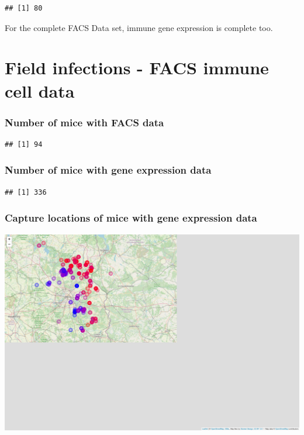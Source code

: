 \documentclass[
]{article}
\newenvironment{Shaded}{\begin{snugshade}}{\end{snugshade}}
\newcommand{\FunctionTok}[1]{\textcolor[rgb]{0.13,0.29,0.53}{\textbf{#1}}}
\newcommand{\NormalTok}[1]{#1}
\newcommand{\SpecialCharTok}[1]{\textcolor[rgb]{0.81,0.36,0.00}{\textbf{#1}}}
\begin{document}
\begin{Shaded}
\end{Shaded}

\begin{verbatim}
## [1] 80
\end{verbatim}

For the complete FACS Data set, immune gene expression is complete too.

\section{Field infections - FACS immune cell
data}\label{field-infections---facs-immune-cell-data}

\subsubsection{Number of mice with FACS
data}\label{number-of-mice-with-facs-data}

\begin{verbatim}
## [1] 94
\end{verbatim}

\subsubsection{Number of mice with gene expression
data}\label{number-of-mice-with-gene-expression-data}

\begin{verbatim}
## [1] 336
\end{verbatim}

\subsubsection{Capture locations of mice with gene expression
data}\label{capture-locations-of-mice-with-gene-expression-data}

\includegraphics{Explorative_Stats_experimental_planning_files/figure-latex/unnamed-chunk-11-1.pdf}
\end{document}
